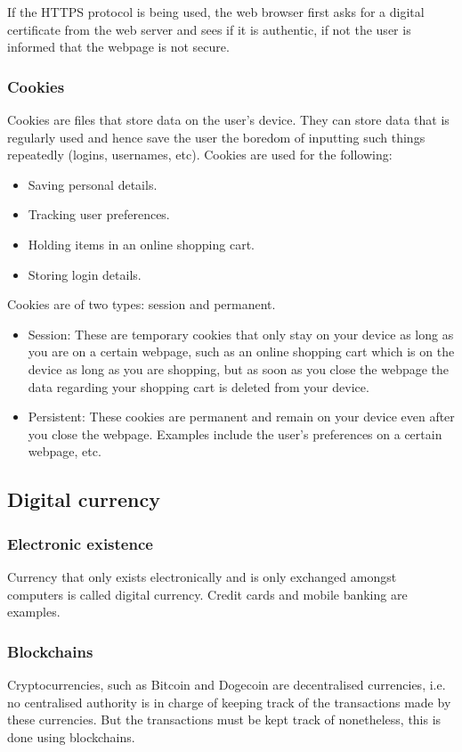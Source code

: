 \documentclass{article}
\begin{document}
If the HTTPS protocol is being used, the web browser first asks for a digital 
certificate from the web server and sees if it is authentic, if not the user is informed
that the webpage is not secure.

\subsubsection{Cookies}
Cookies are files that store data on the user's device. They can store data that is
regularly used and hence save the user the boredom of inputting such things repeatedly
(logins, usernames, etc). Cookies are used for the following:
\begin{itemize}
	\item Saving personal details.
	\item Tracking user preferences.
	\item Holding items in an online shopping cart.
	\item Storing login details.
\end{itemize}
Cookies are of two types: session and permanent.
\begin{itemize}
	\item Session: These are temporary cookies that only stay on your device as long as
		you are on a certain webpage, such as an online shopping cart which is on the
		device as long as you are shopping, but as soon as you close the webpage the
		data regarding your shopping cart is deleted from your device.
	\item Persistent: These cookies are permanent and remain on your device even after
		you close the webpage. Examples include the user's preferences on a certain 
		webpage, etc.
\end{itemize}

\subsection{Digital currency}
\subsubsection{Electronic existence}
Currency that only exists electronically and is only exchanged amongst computers is 
called digital currency. Credit cards and mobile banking are examples. 

\subsubsection{Blockchains}
Cryptocurrencies, such as Bitcoin and Dogecoin are decentralised currencies, i.e. no
centralised authority is in charge of keeping track of the transactions made by these
currencies. But the transactions must be kept track of nonetheless, this is done using
blockchains.
\end{document}
